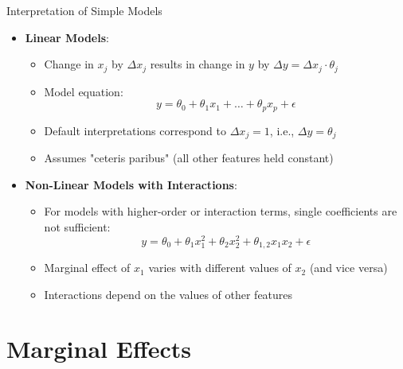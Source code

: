 \documentclass[11pt,compress,t,notes=noshow, aspectratio=169, xcolor=table]{beamer}
\begin{document}
\begin{frame}{Interpretation of Simple Models}
\begin{itemize}
\item \textbf{Linear Models}:
\begin{itemize}
\item Change in $x_j$ by $\Delta x_j$ results in change in $y$ by $\Delta y = \Delta x_j \cdot \theta_j$
\item Model equation:
\[
y = \theta_0 + \theta_1 x_1 + \dots + \theta_p x_p + \epsilon
\]
\item Default interpretations correspond to $\Delta x_j = 1$, i.e., $\Delta y = \theta_j$
\item Assumes "ceteris paribus" (all other features held constant)
\end{itemize}
\item \textbf{Non-Linear Models with Interactions}:
\begin{itemize}
\item For models with higher-order or interaction terms, single coefficients are not sufficient:
\[
y = \theta_0 + \theta_{1} x_1^2 + \theta_{2} x_2^2 + \theta_{1,2} x_1 x_2 + \epsilon
\]
\item Marginal effect of $x_1$ varies with different values of $x_2$ (and vice versa)
\item Interactions depend on the values of other features
\end{itemize}
\end{itemize}
\end{frame}

\section{Marginal Effects}
\end{document}
